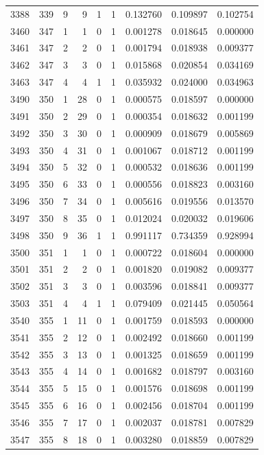 \begin{longtable}{rrrrrrrrr}
3388 & 339 & 9 & 9 & 1 & 1 & 0.132760 & 0.109897 & 0.102754 \\
3460 & 347 & 1 & 1 & 0 & 1 & 0.001278 & 0.018645 & 0.000000 \\
3461 & 347 & 2 & 2 & 0 & 1 & 0.001794 & 0.018938 & 0.009377 \\
3462 & 347 & 3 & 3 & 0 & 1 & 0.015868 & 0.020854 & 0.034169 \\
3463 & 347 & 4 & 4 & 1 & 1 & 0.035932 & 0.024000 & 0.034963 \\
3490 & 350 & 1 & 28 & 0 & 1 & 0.000575 & 0.018597 & 0.000000 \\
3491 & 350 & 2 & 29 & 0 & 1 & 0.000354 & 0.018632 & 0.001199 \\
3492 & 350 & 3 & 30 & 0 & 1 & 0.000909 & 0.018679 & 0.005869 \\
3493 & 350 & 4 & 31 & 0 & 1 & 0.001067 & 0.018712 & 0.001199 \\
3494 & 350 & 5 & 32 & 0 & 1 & 0.000532 & 0.018636 & 0.001199 \\
3495 & 350 & 6 & 33 & 0 & 1 & 0.000556 & 0.018823 & 0.003160 \\
3496 & 350 & 7 & 34 & 0 & 1 & 0.005616 & 0.019556 & 0.013570 \\
3497 & 350 & 8 & 35 & 0 & 1 & 0.012024 & 0.020032 & 0.019606 \\
3498 & 350 & 9 & 36 & 1 & 1 & 0.991117 & 0.734359 & 0.928994 \\
3500 & 351 & 1 & 1 & 0 & 1 & 0.000722 & 0.018604 & 0.000000 \\
3501 & 351 & 2 & 2 & 0 & 1 & 0.001820 & 0.019082 & 0.009377 \\
3502 & 351 & 3 & 3 & 0 & 1 & 0.003596 & 0.018841 & 0.009377 \\
3503 & 351 & 4 & 4 & 1 & 1 & 0.079409 & 0.021445 & 0.050564 \\
3540 & 355 & 1 & 11 & 0 & 1 & 0.001759 & 0.018593 & 0.000000 \\
3541 & 355 & 2 & 12 & 0 & 1 & 0.002492 & 0.018660 & 0.001199 \\
3542 & 355 & 3 & 13 & 0 & 1 & 0.001325 & 0.018659 & 0.001199 \\
3543 & 355 & 4 & 14 & 0 & 1 & 0.001682 & 0.018797 & 0.003160 \\
3544 & 355 & 5 & 15 & 0 & 1 & 0.001576 & 0.018698 & 0.001199 \\
3545 & 355 & 6 & 16 & 0 & 1 & 0.002456 & 0.018704 & 0.001199 \\
3546 & 355 & 7 & 17 & 0 & 1 & 0.002037 & 0.018781 & 0.007829 \\
3547 & 355 & 8 & 18 & 0 & 1 & 0.003280 & 0.018859 & 0.007829 \\

\end{longtable}
